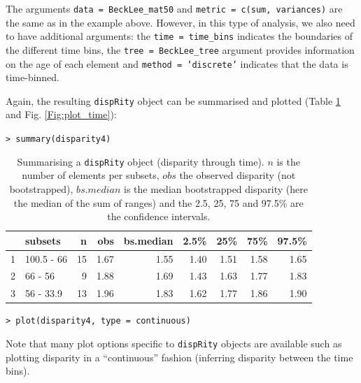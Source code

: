 \documentclass[12pt,letterpaper]{article}
\newcommand{\disp}{\texttt{dispRity} }
\begin{document}
\noindent The arguments \texttt{data = BeckLee\_mat50} and \texttt{metric = c(sum, variances)} are the same as in the example above.
However, in this type of analysis, we also need to have additional arguments: the \texttt{time = time\_bins} indicates the boundaries of the different time bins, the \texttt{tree = BeckLee\_tree} argument provides information on the age of each element and \texttt{method = 'discrete'} indicates that the data is time-binned.

Again, the resulting \disp object can be summarised and plotted (Table \ref{Tab:summary_time} and Fig. \ref{Fig:plot_time}):

\noindent \texttt{> summary(disparity4)}

\begin{table}[ht]
\centering
\begin{tabular}{rlrrrrrrr}
  \hline
 & subsets & n & obs & bs.median & 2.5\% & 25\% & 75\% & 97.5\% \\ 
  \hline
1 & 100.5 - 66 &  15 & 1.67 & 1.55 & 1.40 & 1.51 & 1.58 & 1.65 \\ 
  2 & 66 - 56 &   9 & 1.88 & 1.69 & 1.43 & 1.63 & 1.77 & 1.83 \\ 
  3 & 56 - 33.9 &  13 & 1.96 & 1.83 & 1.62 & 1.77 & 1.86 & 1.90 \\ 
   \hline
\end{tabular}
\caption{Summarising a \disp object (disparity through time). $n$ is the number of elements per subsets, $obs$ the observed disparity (not bootstrapped), $bs.median$ is the median bootstrapped disparity (here the median of the sum of ranges) and the 2.5, 25, 75 and 97.5\% are the confidence intervals.}
\label{Tab:summary_time}
\end{table}

\noindent \texttt{> plot(disparity4, type = \textquotedbl continuous\textquotedbl)}

\noindent Note that many plot options specific to \disp objects are available such as plotting disparity in a ``continuous'' fashion (inferring disparity between the time bins).
\end{document}
